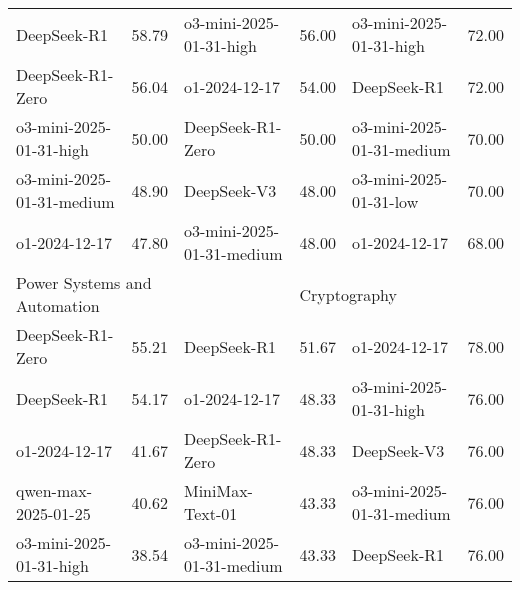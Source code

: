 {\begin{longtable}{p{4.2cm}>{\centering\arraybackslash} p{0.8cm}|p{4.2cm} >{\centering\arraybackslash} p{0.8cm}|p{4.2cm} >{\centering\arraybackslash} p{0.8cm}}
\hline
\cellcolor{blue!5} DeepSeek-R1 & \cellcolor{blue!2}58.79 & \cellcolor{purple!5} o3-mini-2025-01-31-high & \cellcolor{purple!2} 56.00 & \cellcolor{green!5} o3-mini-2025-01-31-high & \cellcolor{green!2} 72.00\\
\cellcolor{blue!5} DeepSeek-R1-Zero & \cellcolor{blue!2}56.04 & \cellcolor{purple!5} o1-2024-12-17 & \cellcolor{purple!2} 54.00 & \cellcolor{green!5} DeepSeek-R1 & \cellcolor{green!2} 72.00\\
\cellcolor{blue!5} o3-mini-2025-01-31-high & \cellcolor{blue!2}50.00 & \cellcolor{purple!5} DeepSeek-R1-Zero & \cellcolor{purple!2} 50.00 & \cellcolor{green!5} o3-mini-2025-01-31-medium & \cellcolor{green!2} 70.00\\
\cellcolor{blue!5} o3-mini-2025-01-31-medium & \cellcolor{blue!2}48.90 & \cellcolor{purple!5} DeepSeek-V3 & \cellcolor{purple!2} 48.00 & \cellcolor{green!5} o3-mini-2025-01-31-low & \cellcolor{green!2} 70.00\\
\cellcolor{blue!5} o1-2024-12-17 & \cellcolor{blue!2}47.80 & \cellcolor{purple!5} o3-mini-2025-01-31-medium & \cellcolor{purple!2} 48.00 & \cellcolor{green!5} o1-2024-12-17 & \cellcolor{green!2} 68.00\\
\hline
\multicolumn{2}{p{5.15cm}|}{\cellcolor{blue!10} \centering Power Systems and Automation} & \multicolumn{2}{p{5.15cm}|}{\cellcolor{purple!10} \centering Harmony} & \multicolumn{2}{p{5.15cm}}{\cellcolor{green!10} \centering Cryptography}\\
\hline
\cellcolor{blue!5} DeepSeek-R1-Zero & \cellcolor{blue!2}55.21 & \cellcolor{purple!5} DeepSeek-R1 & \cellcolor{purple!2} 51.67 & \cellcolor{green!5} o1-2024-12-17 & \cellcolor{green!2} 78.00\\
\cellcolor{blue!5} DeepSeek-R1 & \cellcolor{blue!2}54.17 & \cellcolor{purple!5} o1-2024-12-17 & \cellcolor{purple!2} 48.33 & \cellcolor{green!5} o3-mini-2025-01-31-high & \cellcolor{green!2} 76.00\\
\cellcolor{blue!5} o1-2024-12-17 & \cellcolor{blue!2}41.67 & \cellcolor{purple!5} DeepSeek-R1-Zero & \cellcolor{purple!2} 48.33 & \cellcolor{green!5} DeepSeek-V3 & \cellcolor{green!2} 76.00\\
\cellcolor{blue!5} qwen-max-2025-01-25 & \cellcolor{blue!2}40.62 & \cellcolor{purple!5} MiniMax-Text-01 & \cellcolor{purple!2} 43.33 & \cellcolor{green!5} o3-mini-2025-01-31-medium & \cellcolor{green!2} 76.00\\
\cellcolor{blue!5} o3-mini-2025-01-31-high & \cellcolor{blue!2}38.54 & \cellcolor{purple!5} o3-mini-2025-01-31-medium & \cellcolor{purple!2} 43.33 & \cellcolor{green!5} DeepSeek-R1 & \cellcolor{green!2} 76.00\\

\end{longtable}}

